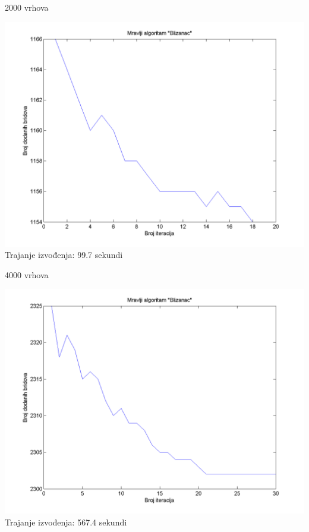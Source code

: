 \documentclass{beamer}
\begin{document}
\begin{frame}{2000 vrhova}
\begin{center}
\includegraphics[scale = 0.45]{1.png}\\
Trajanje izvođenja: 99.7 sekundi\\
\end{center}
\end{frame}

\begin{frame}{4000 vrhova}
\begin{center}
\includegraphics[scale = 0.45]{2.png}\\
Trajanje izvođenja: 567.4 sekundi\\
\end{center}
\end{frame}
\end{document}
